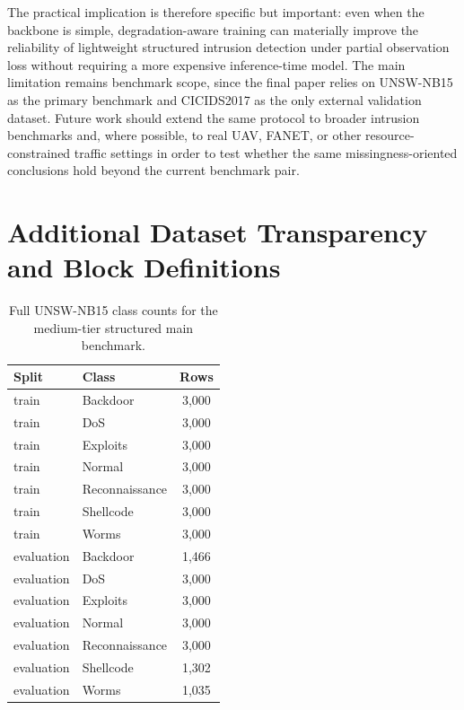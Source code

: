 The practical implication is therefore specific but important: even when the backbone is simple, degradation-aware training can materially improve the reliability of lightweight structured intrusion detection under partial observation loss without requiring a more expensive inference-time model. The main limitation remains benchmark scope, since the final paper relies on UNSW-NB15 as the primary benchmark and CICIDS2017 as the only external validation dataset. Future work should extend the same protocol to broader intrusion benchmarks and, where possible, to real UAV, FANET, or other resource-constrained traffic settings in order to test whether the same missingness-oriented conclusions hold beyond the current benchmark pair.

\appendix
\section{Additional Dataset Transparency and Block Definitions}
\begin{table}[t]
\centering
\caption{Full UNSW-NB15 class counts for the medium-tier structured main benchmark.}
\label{tab:unsw_class_counts}
\begin{tabular}{llc}
\toprule
Split & Class & Rows \\
\midrule
train & Backdoor & 3,000 \\
train & DoS & 3,000 \\
train & Exploits & 3,000 \\
train & Normal & 3,000 \\
train & Reconnaissance & 3,000 \\
train & Shellcode & 3,000 \\
train & Worms & 3,000 \\
evaluation & Backdoor & 1,466 \\
evaluation & DoS & 3,000 \\
evaluation & Exploits & 3,000 \\
evaluation & Normal & 3,000 \\
evaluation & Reconnaissance & 3,000 \\
evaluation & Shellcode & 1,302 \\
evaluation & Worms & 1,035 \\
\bottomrule
\end{tabular}
\end{table}

